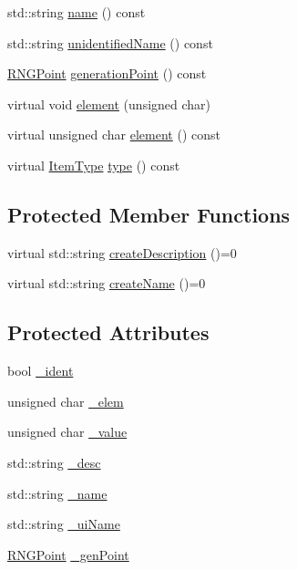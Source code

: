 \begin{DoxyCompactItemize}
\item 
std\+::string \hyperlink{class_flow_1_1_item_a176977d10b96c739e28870bd928e34f8}{name} () const
\item 
std\+::string \hyperlink{class_flow_1_1_item_a7686c3f072a62c2f97c70fe7b2b93f86}{unidentified\+Name} () const
\item 
\hyperlink{struct_flow_1_1_r_n_g_point}{R\+N\+G\+Point} \hyperlink{class_flow_1_1_item_ad40180fcaf6fdd43fb3b9321387beca2}{generation\+Point} () const
\item 
virtual void \hyperlink{class_flow_1_1_item_a9a9f3132cecb67d6104668100f00cd47}{element} (unsigned char)
\item 
virtual unsigned char \hyperlink{class_flow_1_1_item_ae108f4ebbdcd75ac4d4ee1d009330040}{element} () const
\item 
virtual \hyperlink{namespace_flow_a09368c0b65b3d1bc5c227ed1046c8bca}{Item\+Type} \hyperlink{class_flow_1_1_item_ae0c7ea7506ef62f2204837131f021f55}{type} () const
\end{DoxyCompactItemize}
\subsection*{Protected Member Functions}
\begin{DoxyCompactItemize}
\item 
virtual std\+::string \hyperlink{class_flow_1_1_item_abf20647ff13aa4c761828d2d5508c504}{create\+Description} ()=0
\item 
virtual std\+::string \hyperlink{class_flow_1_1_item_a775605940d8a063e7cf5c7d87820d4d1}{create\+Name} ()=0
\end{DoxyCompactItemize}
\subsection*{Protected Attributes}
\begin{DoxyCompactItemize}
\item 
bool \hyperlink{class_flow_1_1_item_abefb3d3a64bfc77c93f0ca9b325c966e}{\+\_\+ident}
\item 
unsigned char \hyperlink{class_flow_1_1_item_a977a018070e3ce6992d652b0cf178cb3}{\+\_\+elem}
\item 
unsigned char \hyperlink{class_flow_1_1_item_a1c1de96ab66fbe77536937564a0852fd}{\+\_\+value}
\item 
std\+::string \hyperlink{class_flow_1_1_item_a43a8e81e91d1ec86e8be9b3172143bda}{\+\_\+desc}
\item 
std\+::string \hyperlink{class_flow_1_1_item_ac7078c7e7317b504c3f3aa017e2f2907}{\+\_\+name}
\item 
std\+::string \hyperlink{class_flow_1_1_item_ae08e5fc92acca2fd0e2b88f9c6d4a750}{\+\_\+ui\+Name}
\item 
\hyperlink{struct_flow_1_1_r_n_g_point}{R\+N\+G\+Point} \hyperlink{class_flow_1_1_item_a87ac75440226f3f7e14211b5eae81618}{\+\_\+gen\+Point}
\end{DoxyCompactItemize}


